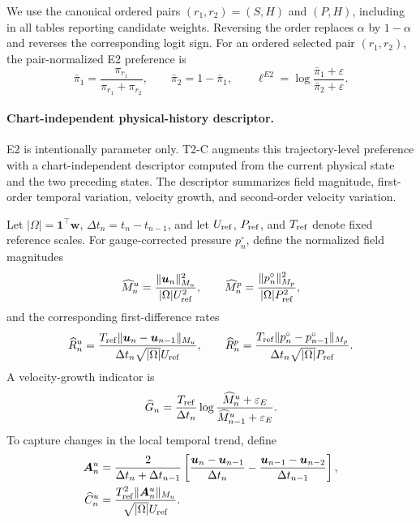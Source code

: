 We use the canonical ordered pairs $(r_1,r_2)=(S,H)$ and $(P,H)$, including in all tables reporting candidate weights. Reversing the order replaces $\alpha$ by $1-\alpha$ and reverses the corresponding logit sign. For an ordered selected pair $(r_1,r_2)$, the pair-normalized E2
preference is
\begin{equation}
  \bar\pi_1
  =
  \frac{\pi_{r_1}}
       {\pi_{r_1}+\pi_{r_2}},
  \qquad
  \bar\pi_2
  =
  1-\bar\pi_1,
  \qquad
  \ell^{E2}
  =
  \log
  \frac{\bar\pi_1+\varepsilon}
       {\bar\pi_2+\varepsilon}.
  \label{eq:app_pair_logit}
\end{equation}


\paragraph{Chart-independent physical-history descriptor.}
E2 is intentionally parameter only.
T2-C augments this trajectory-level preference with a chart-independent
descriptor computed from the current physical state and the two preceding
states.
The descriptor summarizes field magnitude, first-order temporal variation,
velocity growth, and second-order velocity variation.

Let
$|\Omega|=\bm 1^\top\bm w$,
$\Delta t_n=t_n-t_{n-1}$,
and let $U_{\rm ref}$, $P_{\rm ref}$, and $T_{\rm ref}$ denote fixed
reference scales.
For gauge-corrected pressure $p_n^\circ$, define the normalized field
magnitudes
\begin{equation}
  \widehat M_n^u
  =
  \frac{
    \|\bm u_n\|_{M_u}^2
  }{
    |\Omega|U_{\rm ref}^2
  },
  \qquad
  \widehat M_n^p
  =
  \frac{
    \|p_n^\circ\|_{M_p}^2
  }{
    |\Omega|P_{\rm ref}^2
  },
  \label{eq:app_t2c_magnitude}
\end{equation}
and the corresponding first-difference rates
\begin{equation}
  \widehat R_n^u
  =
  \frac{
    T_{\rm ref}
    \|\bm u_n-\bm u_{n-1}\|_{M_u}
  }{
    \Delta t_n\sqrt{|\Omega|}U_{\rm ref}
  },
  \qquad
  \widehat R_n^p
  =
  \frac{
    T_{\rm ref}
    \|p_n^\circ-p_{n-1}^\circ\|_{M_p}
  }{
    \Delta t_n\sqrt{|\Omega|}P_{\rm ref}
  }.
  \label{eq:app_t2c_rate}
\end{equation}
A velocity-growth indicator is
\begin{equation}
  \widehat G_n
  =
  \frac{T_{\rm ref}}{\Delta t_n}
  \log
  \frac{
    \widehat M_n^u+\varepsilon_E
  }{
    \widehat M_{n-1}^u+\varepsilon_E
  }.
  \label{eq:app_t2c_growth}
\end{equation}
To capture changes in the local temporal trend, define
\begin{align}
  \bm A_n^u
  &=
  \frac{2}{\Delta t_n+\Delta t_{n-1}}
  \left[
    \frac{\bm u_n-\bm u_{n-1}}{\Delta t_n}
    -
    \frac{\bm u_{n-1}-\bm u_{n-2}}{\Delta t_{n-1}}
  \right],
  \nonumber\\
  \widehat C_n^u
  &=
  \frac{
    T_{\rm ref}^2
    \|\bm A_n^u\|_{M_u}
  }{
    \sqrt{|\Omega|}U_{\rm ref}
  }.
  \label{eq:app_t2c_curvature}
\end{align}

